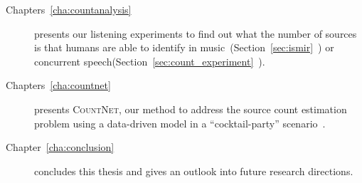 \begin{description}
  \item[Chapters~\ref{cha:countanalysis}] presents our listening experiments to find out what the number of sources is that humans are able to identify in music~(Section~\ref{sec:ismir}~\cite{schoeffler13, stoeter13}) or concurrent speech(Section~\ref{sec:count_experiment}~\cite{stoeter19, stoeter18}). 
  \item[Chapters~\ref{cha:countnet}] presents \textsc{CountNet}, our method to address the source count estimation problem using a data-driven model in a ``cocktail-party'' scenario~\cite{stoeter19}.
  \item[Chapter~\ref{cha:conclusion}] concludes this thesis and gives an outlook into future research directions.
\end{description}

